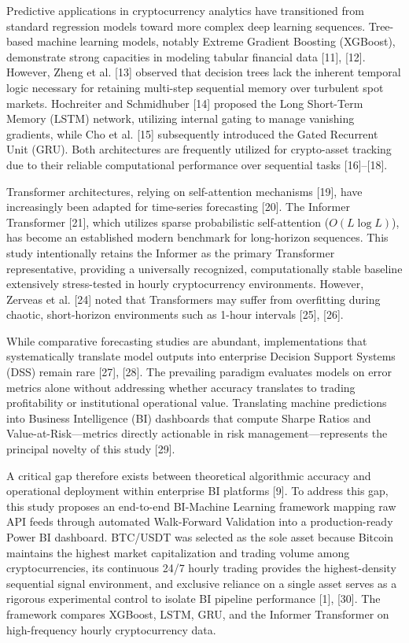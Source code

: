 \documentclass[10pt,a4paper]{article}
\begin{document}
Predictive applications in cryptocurrency analytics have transitioned from standard regression models toward more complex deep learning sequences. Tree-based machine learning models, notably Extreme Gradient Boosting (XGBoost), demonstrate strong capacities in modeling tabular financial data [11], [12]. However, Zheng et al. [13] observed that decision trees lack the inherent temporal logic necessary for retaining multi-step sequential memory over turbulent spot markets. Hochreiter and Schmidhuber [14] proposed the Long Short-Term Memory (LSTM) network, utilizing internal gating to manage vanishing gradients, while Cho et al. [15] subsequently introduced the Gated Recurrent Unit (GRU). Both architectures are frequently utilized for crypto-asset tracking due to their reliable computational performance over sequential tasks [16]--[18].

Transformer architectures, relying on self-attention mechanisms [19], have increasingly been adapted for time-series forecasting [20]. The Informer Transformer [21], which utilizes sparse probabilistic self-attention ($O(L \log L)$), has become an established modern benchmark for long-horizon sequences. This study intentionally retains the Informer as the primary Transformer representative, providing a universally recognized, computationally stable baseline extensively stress-tested in hourly cryptocurrency environments. However, Zerveas et al. [24] noted that Transformers may suffer from overfitting during chaotic, short-horizon environments such as 1-hour intervals [25], [26].

While comparative forecasting studies are abundant, implementations that systematically translate model outputs into enterprise Decision Support Systems (DSS) remain rare [27], [28]. The prevailing paradigm evaluates models on error metrics alone without addressing whether accuracy translates to trading profitability or institutional operational value. Translating machine predictions into Business Intelligence (BI) dashboards that compute Sharpe Ratios and Value-at-Risk---metrics directly actionable in risk management---represents the principal novelty of this study [29].

A critical gap therefore exists between theoretical algorithmic accuracy and operational deployment within enterprise BI platforms [9]. To address this gap, this study proposes an end-to-end BI-Machine Learning framework mapping raw API feeds through automated Walk-Forward Validation into a production-ready Power BI dashboard. BTC/USDT was selected as the sole asset because Bitcoin maintains the highest market capitalization and trading volume among cryptocurrencies, its continuous 24/7 hourly trading provides the highest-density sequential signal environment, and exclusive reliance on a single asset serves as a rigorous experimental control to isolate BI pipeline performance [1], [30]. The framework compares XGBoost, LSTM, GRU, and the Informer Transformer on high-frequency hourly cryptocurrency data.
\end{document}
